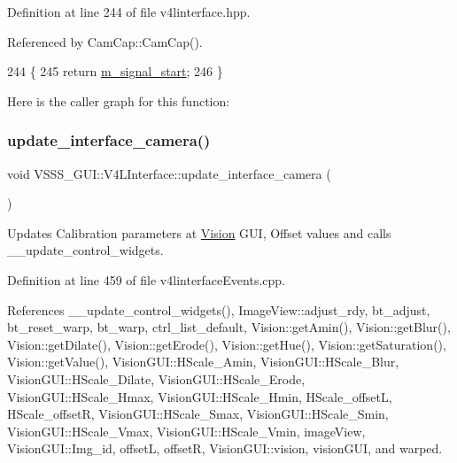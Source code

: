 Definition at line 244 of file v4linterface.\+hpp.



Referenced by Cam\+Cap\+::\+Cam\+Cap().


\begin{DoxyCode}
244                                    \{
245             \textcolor{keywordflow}{return} \hyperlink{class_v_s_s_s___g_u_i_1_1_v4_l_interface_a106a19f83b60b118984f3aece410d140}{m\_signal\_start};
246         \}
\end{DoxyCode}
Here is the caller graph for this function\+:
\mbox{\label{class_v_s_s_s___g_u_i_1_1_v4_l_interface_a13ef172ecb7af3eb140f686b02a80662}} 
\subsubsection{\texorpdfstring{update\+\_\+interface\+\_\+camera()}{update\_interface\_camera()}}
{\footnotesize\ttfamily void V\+S\+S\+S\+\_\+\+G\+U\+I\+::\+V4\+L\+Interface\+::update\+\_\+interface\+\_\+camera (\begin{DoxyParamCaption}{ }\end{DoxyParamCaption})}



Updates Calibration parameters at \hyperlink{class_vision}{Vision} G\+UI, Offset values and calls \+\_\+\+\_\+update\+\_\+control\+\_\+widgets. 



Definition at line 459 of file v4linterface\+Events.\+cpp.



References \+\_\+\+\_\+update\+\_\+control\+\_\+widgets(), Image\+View\+::adjust\+\_\+rdy, bt\+\_\+adjust, bt\+\_\+reset\+\_\+warp, bt\+\_\+warp, ctrl\+\_\+list\+\_\+default, Vision\+::get\+Amin(), Vision\+::get\+Blur(), Vision\+::get\+Dilate(), Vision\+::get\+Erode(), Vision\+::get\+Hue(), Vision\+::get\+Saturation(), Vision\+::get\+Value(), Vision\+G\+U\+I\+::\+H\+Scale\+\_\+\+Amin, Vision\+G\+U\+I\+::\+H\+Scale\+\_\+\+Blur, Vision\+G\+U\+I\+::\+H\+Scale\+\_\+\+Dilate, Vision\+G\+U\+I\+::\+H\+Scale\+\_\+\+Erode, Vision\+G\+U\+I\+::\+H\+Scale\+\_\+\+Hmax, Vision\+G\+U\+I\+::\+H\+Scale\+\_\+\+Hmin, H\+Scale\+\_\+offsetL, H\+Scale\+\_\+offsetR, Vision\+G\+U\+I\+::\+H\+Scale\+\_\+\+Smax, Vision\+G\+U\+I\+::\+H\+Scale\+\_\+\+Smin, Vision\+G\+U\+I\+::\+H\+Scale\+\_\+\+Vmax, Vision\+G\+U\+I\+::\+H\+Scale\+\_\+\+Vmin, image\+View, Vision\+G\+U\+I\+::\+Img\+\_\+id, offsetL, offsetR, Vision\+G\+U\+I\+::vision, vision\+G\+UI, and warped.



